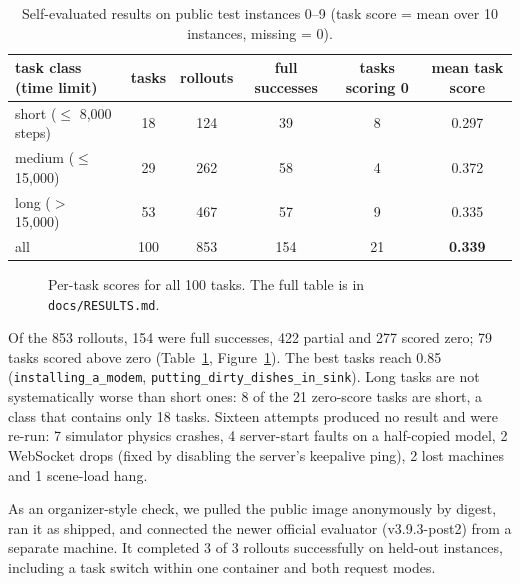 \documentclass[10pt]{article}
\begin{document}
\begin{table}[ht]
\centering\small
\begin{tabular}{@{}lccccc@{}}
\toprule
task class (time limit) & tasks & rollouts & full successes & tasks scoring 0 & mean task score \\
\midrule
short ($\le$ 8{,}000 steps) & 18 & 124 & 39 & 8 & 0.297 \\
medium ($\le$ 15{,}000) & 29 & 262 & 58 & 4 & 0.372 \\
long ($>$ 15{,}000) & 53 & 467 & 57 & 9 & 0.335 \\
\midrule
all & 100 & 853 & 154 & 21 & \textbf{0.339} \\
\bottomrule
\end{tabular}
\caption{Self-evaluated results on public test instances 0--9 (task score = mean over 10 instances, missing = 0).}
\label{tab:results}
\end{table}

\begin{figure}[ht]
\centering
{}
\caption{Per-task scores for all 100 tasks. The full table is in \texttt{docs/RESULTS.md}.}
\label{fig:tasks}
\end{figure}

Of the 853 rollouts, 154 were full successes, 422 partial and 277 scored zero; 79 tasks scored above zero
(Table~\ref{tab:results}, Figure~\ref{fig:tasks}). The best tasks reach 0.85 (\texttt{installing\_a\_modem},
\texttt{putting\_dirty\_dishes\_in\_sink}). Long tasks are not systematically worse than short ones: 8 of the 21 zero-score tasks are short, a class that contains only 18 tasks. Sixteen attempts produced no result and were re-run:
7 simulator physics crashes, 4 server-start faults on a half-copied model, 2 WebSocket drops (fixed by disabling the
server's keepalive ping), 2 lost machines and 1 scene-load hang.

As an organizer-style check, we pulled the public image anonymously by digest, ran it as shipped, and connected the
newer official evaluator (v3.9.3-post2) from a separate machine. It completed 3 of 3 rollouts successfully on held-out
instances, including a task switch within one container and both request modes.
\end{document}
